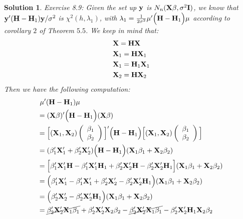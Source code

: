 \documentclass[11pt]{article}
\newtheorem{sol}{Solution}
\begin{document}
\begin{sol}
	Exercise 8.9:\vskip 2mm
	Given the set up ${\bf y}$ is $N_n({\bf X}\beta, \sigma^2 {\bf I})$, we know that ${\bf y}'({\bf H} - {\bf H}_1){\bf y}/\sigma^2$ is $\chi^2(h, \lambda_1)$, with $\lambda_1 = \frac{1}{2\sigma^2}{\bf \mu}'\Big({\bf H} - {\bf H}_1\Big){\bf \mu}$ according to corollary $2$ of Theorem $5.5$.\vskip 2mm
	We keep in mind that:
	\begin{align*}
		&\ {\bf X} ={\bf H}{\bf X}\\
		&\ {\bf X}_1 = {\bf H}{\bf X}_1\\
		&\ {\bf X}_1 = {\bf H}_1{\bf X}_1\\
		&\ {\bf X}_2 = {\bf H}{\bf X}_2
	\end{align*}
	Then we have the following computation:
	\begin{align*}
		&\ {\bf \mu}'({\bf H}- {\bf H}_1){\bf \mu}\\
		&=({\bf X}\beta)'\Big({\bf H} - {\bf H}_1\Big)({\bf X}\beta)\\
		&= \Big[({\bf X}_1, {\bf X}_2)\left(\begin{array}{c} \beta_1\\ \beta_2\end{array}\right)\Big]' \Big({\bf H} - {\bf H}_1\Big)\Big[({\bf X}_1, {\bf X}_2)\left(\begin{array}{c} \beta_1\\ \beta_2\end{array}\right)\Big]\\
		&=({\bf \beta}_1'{\bf X}'_1 + {\bf \beta}_2'{\bf X}_2')\Big({\bf H} - {\bf H}_1\Big)({\bf X}_1\beta_1 + {\bf X}_2\beta_2)\\
		&= \Big[\beta_1'{\bf X}_1'{\bf H} - \beta_1'{\bf X}_1'{\bf H}_1 + \beta_2'{\bf X}_2'{\bf H} - \beta_2'{\bf X}_2'{\bf H}_1\Big]({\bf X}_1\beta_1 + {\bf X}_2\beta_2)\\
		&= \Big(\beta_1'{\bf X}_1' - \beta_1'{\bf X}_1' + \beta_2'{\bf X}_2' - \beta_2'{\bf X}_2'{\bf H}_1\Big)({\bf X}_1\beta_1 + {\bf X}_2\beta_2)\\
		 &= \Big(\beta_2'{\bf X}_2' - \beta_2'{\bf X}_2'{\bf H}_1\Big)({\bf X}_1\beta_1 + {\bf X}_2\beta_2)\\
		 &= \cancel{\beta_2'{\bf X}_2'{\bf X}_1\beta_1}  + \beta_2'{\bf X}_2'{\bf X}_2\beta_2 - \cancel{\beta_2'{\bf X}_2'{\bf X}_1\beta_1} - \beta_2'{\bf X}_2'{\bf H}_1{\bf X}_2\beta_2\\

\end{align*}
\end{sol}
\end{document}
